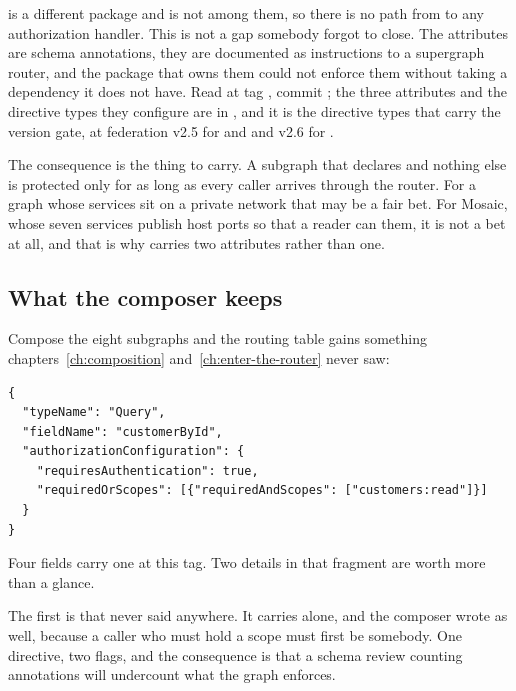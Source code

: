  is a different package and is not among them,
so there is no path from \code{[Authenticated]} to any authorization handler.
This is not a gap somebody forgot to close. The attributes are schema
annotations, they are documented as instructions to a supergraph router, and
the package that owns them could not enforce them without taking a dependency it
does not have. Read at tag , commit ; the three
attributes and the directive types they configure are in
, and it is the directive types that carry the
\code{[Package(...)]} version gate, at federation v2.5 for 
and  and v2.6 for .

The consequence is the thing to carry. A subgraph that declares
 and nothing else is protected only for as long as every
caller arrives through the router. For a graph whose services sit on a private
network that may be a fair bet. For Mosaic, whose seven services publish host
ports so that a reader can  them, it is not a bet at all, and that is
why  carries two attributes rather than one.

\subsection*{What the composer keeps}

%
Compose the eight subgraphs and the routing table gains something
chapters~\ref{ch:composition} and~\ref{ch:enter-the-router} never saw:

\begin{verbatim}
{
  "typeName": "Query",
  "fieldName": "customerById",
  "authorizationConfiguration": {
    "requiresAuthentication": true,
    "requiredOrScopes": [{"requiredAndScopes": ["customers:read"]}]
  }
}
\end{verbatim}

Four fields carry one at this tag. Two details in that fragment are worth more
than a glance.

%
The first is that  never said 
anywhere. It carries \code{[RequiresScopes]} alone, and the composer wrote
 as well, because a caller who must hold a
scope must first be somebody. One directive, two flags, and the consequence is
that a schema review counting  annotations will undercount
what the graph enforces.


